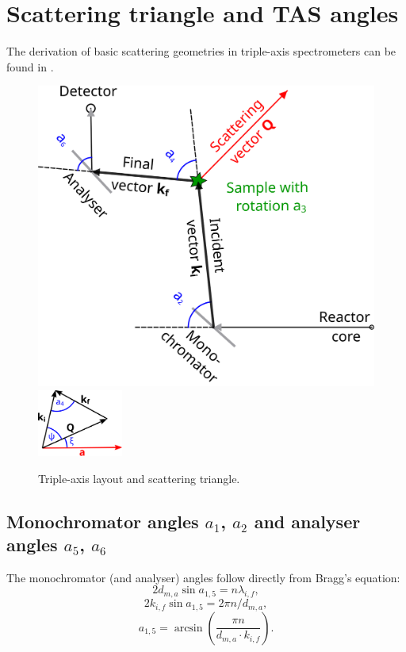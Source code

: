 \section{Scattering triangle and TAS angles \label{sec:tasangles}}

The derivation of basic scattering geometries in triple-axis spectrometers can be found in \cite[Ch. 1.3]{Shirane2002}.

\begin{figure}
\begin{center}
	\includegraphics[width = 0.5 \textwidth]{figures/tas}
	\hspace{1.5cm}
	\includegraphics[trim=0 -2cm 0 0, width=0.25\textwidth]{figures/triangle}
\end{center}
\caption{Triple-axis layout and scattering triangle.}
\end{figure}


\subsection*{Monochromator angles $a_1$, $a_2$ and analyser angles $a_5$, $a_6$}

The monochromator (and analyser) angles follow directly from Bragg's equation:
\begin{equation} 2 d_{m,a}\sin a_{1,5} = n \lambda_{i,f}, \end{equation}
\begin{equation} 2 k_{i,f} \sin a_{1,5} = 2 \pi n / d_{m,a}, \end{equation}
\begin{equation} \boxed{ a_{1,5} = \arcsin \left( \frac{\pi n}{d_{m,a} \cdot k_{i,f}} \right). } \end{equation}

